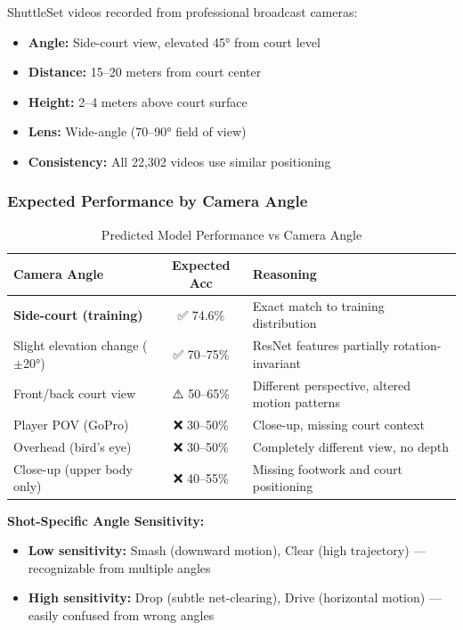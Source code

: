 \documentclass[11pt,a4paper]{article}
\begin{document}
ShuttleSet videos recorded from professional broadcast cameras:

\begin{itemize}
\item \textbf{Angle:} Side-court view, elevated 45° from court level
\item \textbf{Distance:} 15--20 meters from court center
\item \textbf{Height:} 2--4 meters above court surface
\item \textbf{Lens:} Wide-angle (70--90° field of view)
\item \textbf{Consistency:} All 22,302 videos use similar positioning
\end{itemize}

\subsubsection{Expected Performance by Camera Angle}

\begin{table}[H]
\centering
\caption{Predicted Model Performance vs Camera Angle}
\begin{tabular}{lcp{7cm}}
\toprule
Camera Angle & Expected Acc & Reasoning \\
\midrule
\textbf{Side-court (training)} & ✅ 74.6\% & Exact match to training distribution \\
Slight elevation change ($\pm$20°) & ✅ 70--75\% & ResNet features partially rotation-invariant \\
Front/back court view & ⚠️ 50--65\% & Different perspective, altered motion patterns \\
Player POV (GoPro) & ❌ 30--50\% & Close-up, missing court context \\
Overhead (bird's eye) & ❌ 30--50\% & Completely different view, no depth \\
Close-up (upper body only) & ❌ 40--55\% & Missing footwork and court positioning \\
\bottomrule
\end{tabular}
\end{table}

\textbf{Shot-Specific Angle Sensitivity:}

\begin{itemize}
\item \textbf{Low sensitivity:} Smash (downward motion), Clear (high trajectory) --- recognizable from multiple angles
\item \textbf{High sensitivity:} Drop (subtle net-clearing), Drive (horizontal motion) --- easily confused from wrong angles
\end{itemize}
\end{document}
